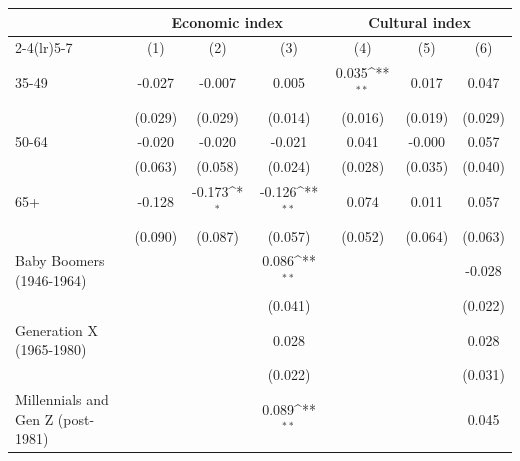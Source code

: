 {
\def\sym#1{\ifmmode^{#1}\else\(^{#1}\)\fi}
\begin{tabular}{l*{6}{c}}
\toprule
                    &\multicolumn{3}{c}{Economic index}                               &\multicolumn{3}{c}{Cultural index}                               \\\cmidrule(lr){2-4}\cmidrule(lr){5-7}
                    &\multicolumn{1}{c}{(1)}         &\multicolumn{1}{c}{(2)}         &\multicolumn{1}{c}{(3)}         &\multicolumn{1}{c}{(4)}         &\multicolumn{1}{c}{(5)}         &\multicolumn{1}{c}{(6)}         \\
\midrule
35-49               &      -0.027         &      -0.007         &       0.005         &       0.035\sym{**} &       0.017         &       0.047         \\
                    &     (0.029)         &     (0.029)         &     (0.014)         &     (0.016)         &     (0.019)         &     (0.029)         \\
50-64               &      -0.020         &      -0.020         &      -0.021         &       0.041         &      -0.000         &       0.057         \\
                    &     (0.063)         &     (0.058)         &     (0.024)         &     (0.028)         &     (0.035)         &     (0.040)         \\
65+                 &      -0.128         &      -0.173\sym{*}  &      -0.126\sym{**} &       0.074         &       0.011         &       0.057         \\
                    &     (0.090)         &     (0.087)         &     (0.057)         &     (0.052)         &     (0.064)         &     (0.063)         \\
Baby Boomers (1946-1964)&                     &                     &       0.086\sym{**} &                     &                     &      -0.028         \\
                    &                     &                     &     (0.041)         &                     &                     &     (0.022)         \\
Generation X (1965-1980)&                     &                     &       0.028         &                     &                     &       0.028         \\
                    &                     &                     &     (0.022)         &                     &                     &     (0.031)         \\
Millennials and Gen Z (post-1981)&                     &                     &       0.089\sym{**} &                     &                     &       0.045         \\

\end{tabular}}
